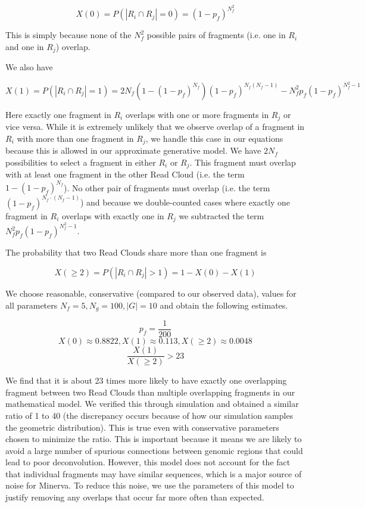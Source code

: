 \[  X(0) = P(|R_i \cap R_j| = 0) = (1 - p_f)^{N_f^2} \]

This is simply because none of the $N_f^2$ possible pairs of fragments (i.e. one in $R_i$ and one in $R_j$) overlap.

We also have


\[  X(1) = P(|R_i \cap R_j| = 1) = 2N_f(1 - (1-p_f)^{N_f})(1-p_f)^{N_f(N_f-1)} - N_f^2p_f(1-p_f)^{N_f^2 - 1} \]

Here exactly one fragment in $R_i$ overlaps with one or more fragments in $R_j$ or vice versa. While it is extremely unlikely that we observe overlap of a fragment in $R_i$ with more than one fragment in $R_j$, we handle this case in our equations because this is allowed in our approximate generative model. We have $2N_f$ possibilities to select a fragment in either $R_i$ or $R_j$. This fragment must overlap with at least one fragment in the other Read Cloud (i.e. the term $1 - (1-p_f)^{N_f}$). No other pair of fragments must overlap (i.e. the term $(1-p_f)^{N_f \cdot (N_f-1)}$) and because we double-counted cases where exactly one fragment in $R_i$ overlaps with exactly one in $R_j$ we subtracted the term $ N_f^2p_f(1-p_f)^{N_f^2 - 1}$.


The probability that two Read Clouds share more than one fragment is

\[  X(\geq 2) = P(|R_i \cap R_j| > 1) = 1 - X(0) - X(1) \]

We choose reasonable, conservative (compared to our observed data), values for all parameters $N_f = 5, N_g = 100, |G| = 10$ and obtain the following estimates.

\[ p_f = \frac{1}{200} \]
\[ X(0) \approx 0.8822, X(1) \approx 0.113,  X(\geq 2) \approx 0.0048 \]
\[ \frac{X(1)}{X(\geq 2)} > 23\]

We find that it is about 23 times more likely to have exactly one overlapping fragment between two Read Clouds than multiple overlapping fragments in our mathematical model. We verified this through simulation and obtained a similar ratio of 1 to 40 (the discrepancy occurs because of how our simulation samples the geometric distribution). This is true even with conservative parameters chosen to minimize the ratio. This is important because it means we are likely to avoid a large number of spurious connections between genomic regions that could lead to poor deconvolution. However, this model does not account for the fact that individual fragments may have similar sequences, which is a major source of noise for Minerva. To reduce this noise, we use the parameters of this model to justify removing any overlaps that occur far more often than expected.

